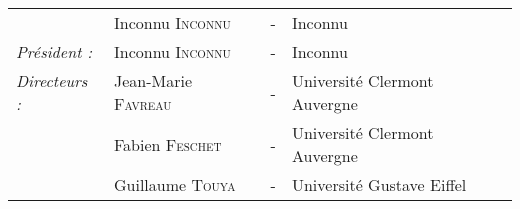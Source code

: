 \begin{titlepage}
\begin{center}
\begin{tabular}{llcl}
                              & Inconnu \textsc{Inconnu}		& - & Inconnu \\
      \textit{Président :}	& Inconnu \textsc{Inconnu}		& - & Inconnu \\
      \textit{Directeurs :}	& Jean-Marie \textsc{Favreau}		& - & Université Clermont Auvergne \\
                              & Fabien \textsc{Feschet}		& - & Université Clermont Auvergne\\
                              & Guillaume \textsc{Touya}		& - & Université Gustave Eiffel \\
\end{tabular}
\end{center}
\end{titlepage}

\sloppy

\titlepage

